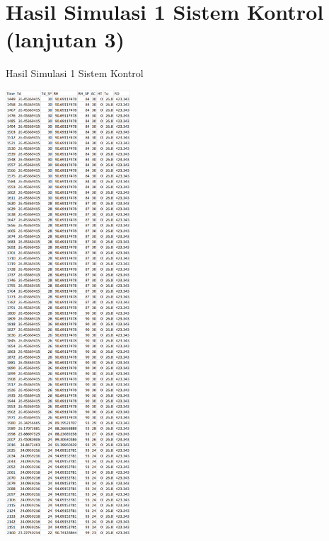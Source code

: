 \section{Hasil Simulasi 1 Sistem Kontrol (lanjutan 3)}
\begin{table}[!h]
	\caption{Hasil Simulasi 1 Sistem Kontrol}
	\label{tbl:A:HasilSimulasiKontrol3}
	\centering
	\includegraphics[width=0.35\textwidth]{figures/HasilSimulasiSimulink3}
\end{table}
\break

